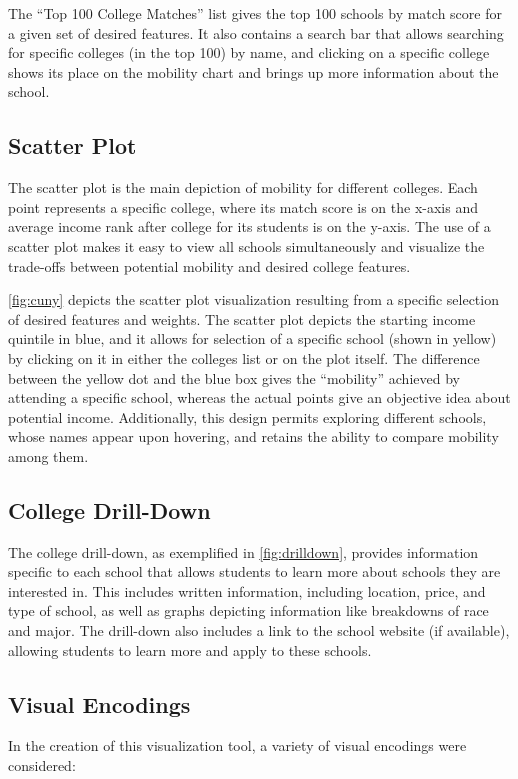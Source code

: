 \documentclass{vgtc}
\begin{document}
The ``Top 100 College Matches'' list gives the top 100 schools by match score for a given set of desired features. It also contains a search bar that allows searching for specific colleges (in the top 100) by name, and clicking on a specific college shows its place on the mobility chart and brings up more information about the school.

\subsection{Scatter Plot}
The scatter plot is the main depiction of mobility for different colleges. Each point represents a specific college, where its match score is on the x-axis and average income rank after college for its students is on the y-axis. The use of a scatter plot makes it easy to view all schools simultaneously and visualize the trade-offs between potential mobility and desired college features.

\autoref{fig:cuny} depicts the scatter plot visualization resulting from a specific selection of desired features and weights. The scatter plot depicts the starting income quintile in blue, and it allows for selection of a specific school (shown in yellow) by clicking on it in either the colleges list or on the plot itself. The difference between the yellow dot and the blue box gives the ``mobility'' achieved by attending a specific school, whereas the actual points give an objective idea about potential income. Additionally, this design permits exploring different schools, whose names appear upon hovering, and retains the ability to compare mobility among them.

\subsection{College Drill-Down}
The college drill-down, as exemplified in \autoref{fig:drilldown}, provides information specific to each school that allows students to learn more about schools they are interested in. This includes written information, including location, price, and type of school, as well as graphs depicting information like breakdowns of race and major. The drill-down also includes a link to the school website (if available), allowing students to learn more and apply to these schools.

\subsection{Visual Encodings}
In the creation of this visualization tool, a variety of visual encodings were considered:
\end{document}
